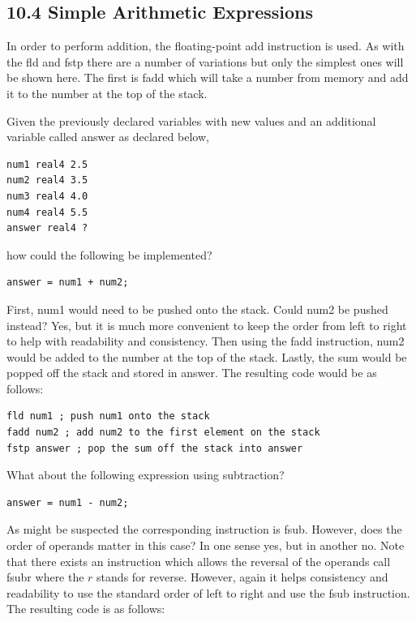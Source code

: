 \documentclass[10pt]{book}
\begin{document}
\begin{center}
\begin{center}
\begin{center}
\begin{center}
\subsection*{10.4 Simple Arithmetic Expressions}
In order to perform addition, the floating-point add instruction is used. As with the fld and fstp there are a number of variations but only the simplest ones will be shown here. The first is fadd which will take a number from memory and add it to the number at the top of the stack.

Given the previously declared variables with new values and an additional variable called answer as declared below,

\begin{verbatim}
num1 real4 2.5
num2 real4 3.5
num3 real4 4.0
num4 real4 5.5
answer real4 ?
\end{verbatim}

how could the following be implemented?


\begin{verbatim}
answer = num1 + num2;
\end{verbatim}

First, num1 would need to be pushed onto the stack. Could num2 be pushed instead? Yes, but it is much more convenient to keep the order from left to right to help with readability and consistency. Then using the fadd instruction, num2 would be added to the number at the top of the stack. Lastly, the sum would be popped off the stack and stored in answer. The resulting code would be as follows:

\begin{verbatim}
fld num1 ; push num1 onto the stack
fadd num2 ; add num2 to the first element on the stack
fstp answer ; pop the sum off the stack into answer
\end{verbatim}

What about the following expression using subtraction?

\begin{verbatim}
answer = num1 - num2;
\end{verbatim}

As might be suspected the corresponding instruction is fsub. However, does the order of operands matter in this case? In one sense yes, but in another no. Note that there exists an instruction which allows the reversal of the operands call fsubr where the $r$ stands for reverse. However, again it helps consistency and readability to use the standard order of left to right and use the fsub instruction. The resulting code is as follows:


\end{center}
\end{center}
\end{center}
\end{center}
\end{document}
